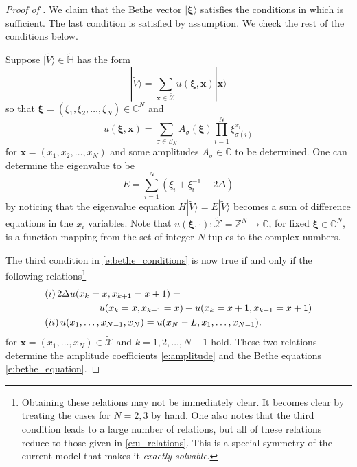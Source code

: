 \documentclass[a4paper,11pt]{article}
\theoremstyle{definition}
\begin{document}
\begin{proof} [Proof of ]
We claim that the Bethe vector $|\mathbf{\boldsymbol{\xi}} \rangle$ satisfies the conditions in  which is sufficient. The last condition is satisfied by assumption. We check the rest of the conditions below.

Suppose  $|\tilde{V} \rangle \in \tilde{\mathbb{H}}$ has the form
\begin{equation}
    |\tilde{V} \rangle = \sum_{\mathbf{x} \in \tilde{\mathcal{X}}} u(\mathbf{\boldsymbol{\xi}}, \mathbf{x}) | \mathbf{x} \rangle
\end{equation}
so that $\mathbf{\boldsymbol{\xi}} = (\xi_1 , \xi_2, \dots, \xi_N) \in \mathbb{C}^N$ and
\begin{equation}
    u(\mathbf{\boldsymbol{\xi}}, \mathbf{x}) = \sum_{\sigma \in S_N} A_{\sigma}(\mathbf{\boldsymbol{\xi}}) \prod_{i=1}^N \xi_{\sigma(i)}^{x_i}
\end{equation}
for $\mathbf{x} = (x_1 , x_2, \dots, x_N)$ and some amplitudes $A_{\sigma} \in \mathbb{C}$ to be determined. One can determine the eigenvalue to be
\begin{equation}
    E = \sum_{i=1}^N \left(\xi_i + \xi_i^{-1} -2 \Delta \right)
\end{equation}
by noticing that the eigenvalue equation $H|\tilde{V}\rangle=E|\tilde{V}\rangle$ becomes a sum of difference equations in the $x_i$ variables. 
Note that $u(\mathbf{\boldsymbol{\xi}}, \cdot): \tilde{\mathcal{X}} =\mathbb{Z}^N \rightarrow \mathbb{C}$, for fixed $\boldsymbol{\xi} \in \mathbb{C}^N$, is a function mapping from the set of integer $N$-tuples to the complex numbers.

The third condition in \eqref{e:bethe_conditions} is now true if and only if the following relations\footnote{Obtaining these relations may not be immediately clear. It becomes clear by treating the cases for $N=2,3$ by hand. One also notes that the third condition leads to a large number of relations, but all of these relations reduce to those given in \eqref{e:u_relations}. This is a special symmetry of the current model that makes it \emph{exactly solvable}.} 
\begin{equation}\label{e:u_relations}
    \begin{split}
    &(i)\, 2 \Delta u(x_k =x, x_{k+1} = x+1)=\\
    &\hspace{20mm} u(x_k =x, x_{k+1} = x) + u(x_{k}=x+1, x_{k+1} = x+1) \\
    &(ii)\, u(x_1, \dots, x_{N-1}, x_N) = u(x_{N}-L, x_1, \dots, x_{N-1}).
    \end{split}
\end{equation}
for $\mathbf{x} = (x_1, \dots, x_N) \in \tilde{\mathcal{X}}$ and $k=1, 2, \dots, N-1$ hold. These two relations determine the amplitude coefficients \eqref{e:amplitude} and the Bethe equations \eqref{e:bethe_equation}. 


\end{proof}
\end{document}
